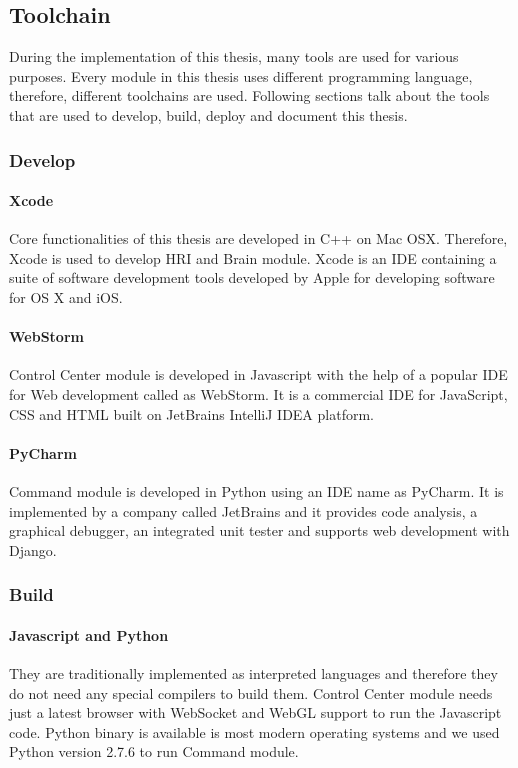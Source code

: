 \subsection{Toolchain} During the implementation of this thesis, many tools are used for various purposes. Every module in this thesis uses different programming language, therefore, different toolchains are used. Following sections talk about the tools that are used to develop, build, deploy and document this thesis. 

\subsubsection{Develop}
\paragraph*{Xcode} Core functionalities of this thesis are developed in C++ on Mac OSX. Therefore, Xcode is used to develop HRI and Brain module. Xcode is an IDE containing a suite of software development tools developed by Apple for developing software for OS X and iOS.

\paragraph*{WebStorm} Control Center module is developed in Javascript with the help of a popular IDE for Web development called as WebStorm. It is a commercial IDE for JavaScript, CSS and HTML built on JetBrains IntelliJ IDEA platform.

\paragraph*{PyCharm} Command module is developed in Python using an IDE name as PyCharm. It is implemented by a company called JetBrains and it provides code analysis, a graphical debugger, an integrated unit tester and supports web development with Django.

\subsubsection{Build}
\paragraph*{Javascript and Python} They are traditionally implemented as interpreted languages and therefore they do not need any special compilers to build them. Control Center module needs just a latest browser with WebSocket and WebGL support to run the Javascript code. Python binary is available is most modern operating systems and we used Python version 2.7.6 to run Command module. 

